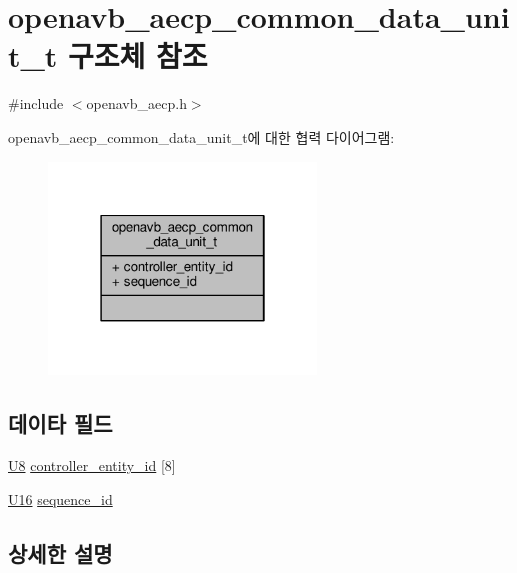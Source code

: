 \hypertarget{structopenavb__aecp__common__data__unit__t}{}\section{openavb\+\_\+aecp\+\_\+common\+\_\+data\+\_\+unit\+\_\+t 구조체 참조}
\label{structopenavb__aecp__common__data__unit__t}


{\ttfamily \#include $<$openavb\+\_\+aecp.\+h$>$}



openavb\+\_\+aecp\+\_\+common\+\_\+data\+\_\+unit\+\_\+t에 대한 협력 다이어그램\+:
\nopagebreak
\begin{figure}[H]
\begin{center}
\leavevmode
\includegraphics[width=202pt]{structopenavb__aecp__common__data__unit__t__coll__graph}
\end{center}
\end{figure}
\subsection*{데이타 필드}
\begin{DoxyCompactItemize}
\item 
\hyperlink{openavb__types__base__pub_8h_aa63ef7b996d5487ce35a5a66601f3e73}{U8} \hyperlink{structopenavb__aecp__common__data__unit__t_a8b74ba582b9c19e1f2e475925f7cfb2f}{controller\+\_\+entity\+\_\+id} \mbox{[}8\mbox{]}
\item 
\hyperlink{openavb__types__base__pub_8h_a0a0a322d5fa4a546d293a77ba8b4a71f}{U16} \hyperlink{structopenavb__aecp__common__data__unit__t_ada45e1a0fe13471280842df714983d95}{sequence\+\_\+id}
\end{DoxyCompactItemize}


\subsection{상세한 설명}


